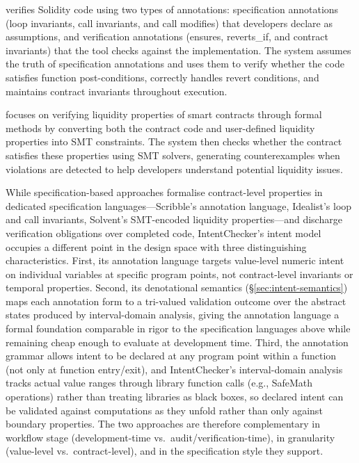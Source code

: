 \documentclass[pdflatex,sn-basic]{sn-jnl}%
\theoremstyle{thmstyleone}%
\theoremstyle{thmstyletwo}%
\theoremstyle{thmstylethree}%
\begin{document}
\citep{idealist} verifies Solidity code using two types of annotations: specification annotations (loop invariants, call invariants, and call modifies) that developers declare as assumptions,
and verification annotations (ensures, reverts\_if, and contract invariants) that the tool checks against the implementation.
The system assumes the truth of specification annotations and uses them to verify whether the code satisfies function post-conditions,
correctly handles revert conditions, and maintains contract invariants throughout execution.

\citep{solvent} focuses on verifying liquidity properties of smart contracts through formal methods
by converting both the contract code and user-defined liquidity properties into SMT constraints.
The system then checks whether the contract satisfies these properties using SMT solvers,
generating counterexamples when violations are detected to help developers understand potential liquidity issues.


While specification-based approaches formalise contract-level properties in dedicated specification languages---Scribble's annotation language, Idealist's loop and call invariants, Solvent's SMT-encoded liquidity properties---and discharge verification obligations over completed code, IntentChecker's intent model occupies a different point in the design space with three distinguishing characteristics.
First, its annotation language targets value-level numeric intent on individual variables at specific program points, not contract-level invariants or temporal properties.
Second, its denotational semantics (§\ref{sec:intent-semantics}) maps each annotation form to a tri-valued validation outcome over the abstract states produced by interval-domain analysis, giving the annotation language a formal foundation comparable in rigor to the specification languages above while remaining cheap enough to evaluate at development time.
Third, the annotation grammar allows intent to be declared at any program point within a function (not only at function entry/exit), and IntentChecker's interval-domain analysis tracks actual value ranges through library function calls (e.g., SafeMath operations) rather than treating libraries as black boxes, so declared intent can be validated against computations as they unfold rather than only against boundary properties.
The two approaches are therefore complementary in workflow stage (development-time vs.\ audit/verification-time), in granularity (value-level vs.\ contract-level), and in the specification style they support.
\end{document}
